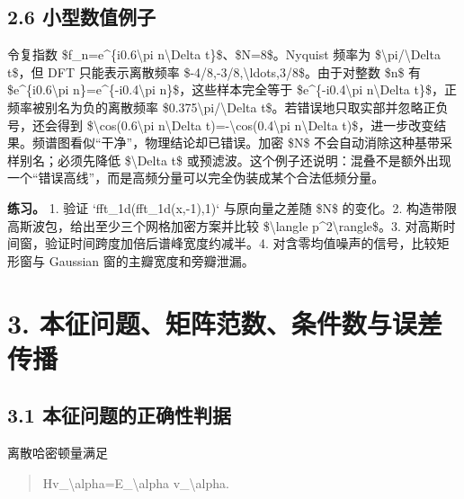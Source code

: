 \documentclass[UTF8,openany,11pt,fontset=fandol]{ctexbook}
\begin{document}
\subsection{\texorpdfstring{\textbf{2.6
小型数值例子}}{2.6 小型数值例子}}\label{ux5c0fux578bux6570ux503cux4f8bux5b50}

令复指数 \$f\_n=e\^{}\{i0.6\textbackslash pi n\textbackslash Delta
t\}\$、\$N=8\$。Nyquist 频率为 \$\textbackslash pi/\textbackslash Delta
t\$，但 DFT 只能表示离散频率
\$-4/8,-3/8,\textbackslash ldots,3/8\$。由于对整数 \$n\$ 有
\$e\^{}\{i0.6\textbackslash pi n\}=e\^{}\{-i0.4\textbackslash pi
n\}\$，这些样本完全等于 \$e\^{}\{-i0.4\textbackslash pi
n\textbackslash Delta t\}\$，正频率被别名为负的离散频率
\$0.375\textbackslash pi/\textbackslash Delta
t\$。若错误地只取实部并忽略正负号，还会得到
\$\textbackslash cos(0.6\textbackslash pi n\textbackslash Delta
t)=-\textbackslash cos(0.4\textbackslash pi n\textbackslash Delta
t)\$，进一步改变结果。频谱图看似``干净''，物理结论却已错误。加密 \$N\$
不会自动消除这种基带采样别名；必须先降低 \$\textbackslash Delta t\$
或预滤波。这个例子还说明：混叠不是额外出现一个``错误高线''，而是高频分量可以完全伪装成某个合法低频分量。

\textbf{练习。} 1. 验证 `fft\_1d(fft\_1d(x,-1),1)` 与原向量之差随 \$N\$
的变化。2. 构造带限高斯波包，给出至少三个网格加密方案并比较
\$\textbackslash langle p\^{}2\textbackslash rangle\$。3.
对高斯时间窗，验证时间跨度加倍后谱峰宽度约减半。4.
对含零均值噪声的信号，比较矩形窗与 Gaussian 窗的主瓣宽度和旁瓣泄漏。

\section{\texorpdfstring{\textbf{3.
本征问题、矩阵范数、条件数与误差传播}}{3. 本征问题、矩阵范数、条件数与误差传播}}\label{ux672cux5f81ux95eeux9898ux77e9ux9635ux8303ux6570ux6761ux4ef6ux6570ux4e0eux8befux5deeux4f20ux64ad}

\subsection{\texorpdfstring{\textbf{3.1
本征问题的正确性判据}}{3.1 本征问题的正确性判据}}\label{ux672cux5f81ux95eeux9898ux7684ux6b63ux786eux6027ux5224ux636e}

离散哈密顿量满足

\begin{quote}
Hv\_\textbackslash alpha=E\_\textbackslash alpha
v\_\textbackslash alpha.
\end{quote}
\end{document}
